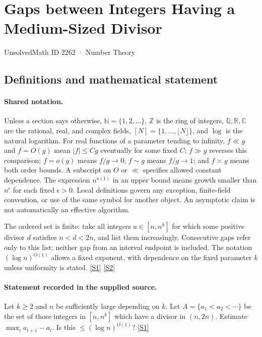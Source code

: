 \documentclass[11pt,a4paper]{article}
\newcommand{\N}{\mathbb{N}}
\newcommand{\Z}{\mathbb{Z}}
\newcommand{\Q}{\mathbb{Q}}
\newcommand{\R}{\mathbb{R}}
\newcommand{\C}{\mathbb{C}}
\newcommand{\sref}[2]{\hyperlink{source:#1:#2}{[S#2]}}
\begin{document}

\setcounter{section}{2261}

\section{Gaps between Integers Having a Medium-Sized Divisor}\label{2262}

{\small\sffamily UnsolvedMath ID 2262 · Number Theory}

\subsection{Definitions and mathematical statement}

\paragraph{Shared notation.}Unless a section says otherwise, $\N=\{1,2,\ldots\}$,
$\Z$ is the ring of integers, $\Q,\R,\C$ are the rational, real, and complex
fields, $[N]=\{1,\ldots,\lfloor N\rfloor\}$, and $\log$ is the natural
logarithm. For real functions of a parameter tending to infinity,
$f\ll g$ and $f=O(g)$ mean $|f|\leq Cg$ eventually for some fixed $C$;
$f\gg g$ reverses this comparison; $f=o(g)$ means $f/g\to0$;
$f\sim g$ means $f/g\to1$; and $f\asymp g$ means both order bounds.
A subscript on $O$ or $\ll$ specifies allowed constant dependence.
The expression $n^{o(1)}$ in an upper bound means growth smaller than
$n^\epsilon$ for each fixed $\epsilon>0$. Local definitions govern any
exception, finite-field convention, or use of the same symbol for another
object. An asymptotic claim is not automatically an effective algorithm.



The ordered set is finite: take all integers $a\in[n,n^k]$ for which some positive divisor $d$ satisfies $n<d<2n$, and list them increasingly. Consecutive gaps refer only to this list; neither gap from an interval endpoint is included. The notation $(\log n)^{O(1)}$ allows a fixed exponent, with dependence on the fixed parameter $k$ unless uniformity is stated. \sref{2262}{1} \sref{2262}{2}

\paragraph{Statement recorded in the supplied source.}
Let $k\geq 2$ and $n$ be sufficiently large depending on $k$. Let $A=\{a_1<a_2<\cdots \}$ be the set of those integers in $[n,n^k]$ which have a divisor in $(n,2n)$. Estimate $ \max_{i} a_{i+1}-a_i. $ Is this $\leq (\log n)^{O(1)}$? \sref{2262}{1}
\end{document}
